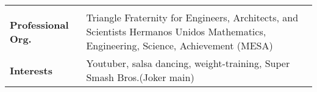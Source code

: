 \documentclass[10pt]{article}
\begin{document}
\begin{longtable}{l l l l}
{        } \\
    \multicolumn{1}{p{2cm}}{\textbf{Professional \newline Org.}}        &
    
        \multicolumn{3}{p{16cm}}{
            Triangle Fraternity for Engineers, Architects, and Scientists \newline
            Hermanos Unidos \newline
            Mathematics, Engineering, Science, Achievement (MESA)
        } \\
    
    \multicolumn{1}{p{2cm}}{\textbf{Interests}}         &
        \multicolumn{3}{p{16cm}}{
            Youtuber, salsa dancing, weight-training, Super Smash Bros.(Joker main)}
\end{longtable}
\end{document}
